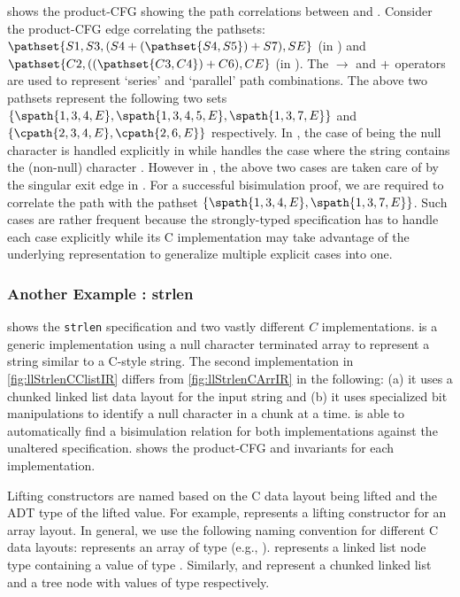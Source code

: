  shows the product-CFG showing the path correlations between \sprog{} and \cprog{}.
Consider the product-CFG edge  correlating the pathsets:
$\pathset{S1,S3,(S4 \pathpar (\pathset{S4,S5}) \pathpar S7), SE}$ (in \sprog{}) and
$\pathset{C2,((\pathset{C3,C4}) \pathpar C6),CE}$ (in \cprog{}).
The $\rightarrow$ and $+$ operators are used to represent `series' and `parallel' path combinations.
The above two pathsets represent the following two sets
$\{ \spath{1,3,4,E},\spath{1,3,4,5,E},\spath{1,3,7,E} \}$ and
$\{ \cpath{2,3,4,E}, \cpath{2,6,E} \}$ respectively.
In \sprog{}, the case of  being the null character is handled explicitly in  while
 handles the case where the string  contains the (non-null) character .
However in \cprog{}, the above two cases are taken care of by the singular exit edge in .
For a successful bisimulation proof, we are required to correlate the \cprog{} path
 with the \sprog{} pathset $\{ \spath{1,3,4,E}, \spath{1,3,7,E} \}$.
Such cases are rather frequent because the strongly-typed specification has to handle
each case explicitly while its C implementation may take advantage of the
underlying representation to generalize multiple explicit cases into one.





\subsubsection{Another Example : strlen}
 shows the {\tt strlen} specification and two vastly
different $C$ implementations.  is a generic implementation
using a null character terminated array to represent a string similar to a C-style string.
The second implementation in \cref{fig:llStrlenCClistIR} differs from \cref{fig:llStrlenCArrIR}
in the following: (a) it uses a chunked linked list data layout for the input string
and (b) it uses specialized bit manipulations to identify a null character in a chunk at a time.
\toolName{} is able to automatically find a bisimulation relation
for both implementations against the unaltered specification.
 shows the product-CFG and invariants for each implementation.

Lifting constructors are named based on the C data layout being lifted
and the \SpecL{} ADT type of the lifted value.
For example,  represents a  lifting constructor
for an array layout.
In general, we use the following naming convention for different C data layouts:
 represents an array of type  (e.g., ).
 represents a linked list node type containing a value of type .
Similarly,  and  represent a chunked linked list and a tree node
with values of type  respectively.

